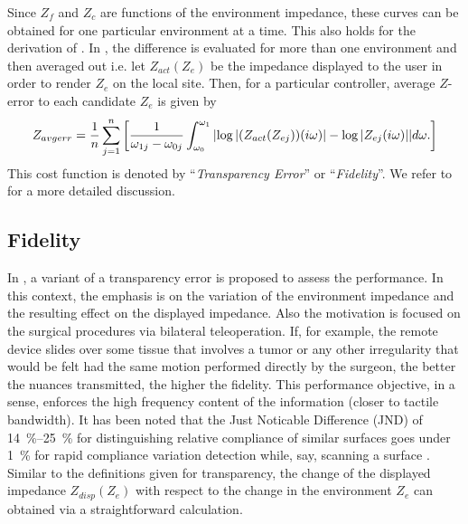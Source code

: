 Since $Z_f$ and $Z_c$ are functions of the environment impedance, these curves can be obtained for one particular environment
at a time. This also holds for the derivation of \cite{lawrence}. In \cite{goranthesis}, the difference  is evaluated for more 
than one environment and then averaged out i.e. let $Z_{act}(Z_e)$ be the impedance displayed to the user in order to render 
$Z_e$ on the local site. Then, for a particular controller, average $Z$-error to each candidate $Z_e$ is given by
\begin{equation}
Z_{avgerr} = \frac{1}{n}\sum_{j=1}^n{\left[
    \frac{1}{\omega_{1j}-\omega_{0j}}\int_{\omega_0}^{\omega_1}{%
                                     \abs{\log|(Z_{act}(Z_{ej}))(\iw)|-\log |Z_{ej}(\iw)|}}d\omega.
                                     \right]}
\label{eq:zdiff}
\end{equation}
This cost function is denoted by \enquote{\emph{Transparency Error}} or \enquote{\emph{Fidelity}}. We refer to \cite{weir} 
for a more detailed discussion. 


\subsection{Fidelity}\label{sec:perf:fidelity}
In \cite{cavusoglu}, a variant of a transparency error is proposed to assess the performance. In this context, 
the emphasis is on the variation of the environment impedance and the resulting effect on the displayed impedance. 
Also the motivation is focused on the surgical procedures via bilateral teleoperation. If, for 
example, the remote device slides over some tissue that involves a tumor or any other irregularity that would be felt
had the same motion performed directly by the surgeon, the better the nuances transmitted, the higher
the fidelity. This performance objective, in a sense, enforces the high frequency content of the information (closer
to tactile bandwidth). It has been noted that the Just Noticable Difference (JND) of \SIrange{14}{25}{\percent} for 
distinguishing relative compliance of similar surfaces goes under \SI{1}{\percent} for rapid compliance variation detection 
while, say, scanning a surface \cite{dhruvtendick}. Similar to the definitions given for transparency, the change of the 
displayed impedance $Z_{disp}(Z_e)$ with respect to the change in the environment $Z_e$ can obtained via a straightforward 
calculation.

